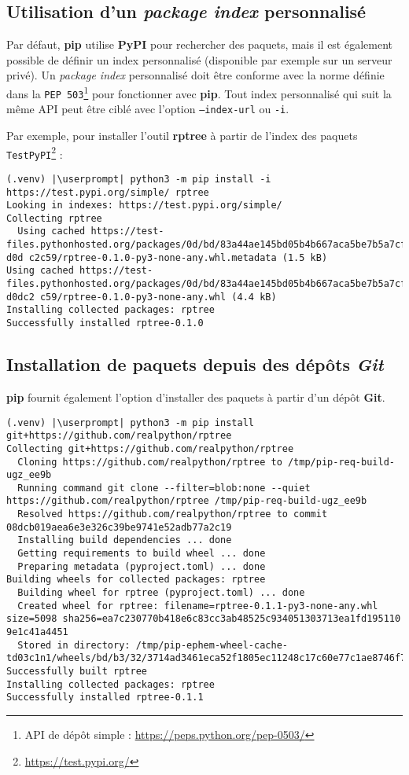 \subsection*{Utilisation d’un \textit{package index} personnalisé}
Par défaut, \textbf{pip} utilise \textbf{PyPI} pour rechercher des paquets, mais il est également possible de définir un index personnalisé (disponible par exemple sur un serveur privé). Un \textit{package index} personnalisé doit être conforme avec la norme définie dans la \texttt{PEP 503}\footnote{API de dépôt simple : \url{https://peps.python.org/pep-0503/}} pour fonctionner avec \textbf{pip}. Tout index personnalisé qui suit la même API peut être ciblé avec l’option \texttt{--index-url} ou \texttt{-i}.

Par exemple, pour installer l’outil \textbf{rptree} à partir de l’index des paquets \texttt{TestPyPI}\footnote{\url{https://test.pypi.org/}} :
\begin{lstlisting}[style=bash]
(.venv) |\userprompt| python3 -m pip install -i https://test.pypi.org/simple/ rptree
Looking in indexes: https://test.pypi.org/simple/
Collecting rptree
  Using cached https://test-files.pythonhosted.org/packages/0d/bd/83a44ae145bd05b4b667aca5be7b5a7cf61d0d26577c0c93f2a2 d0d c2c59/rptree-0.1.0-py3-none-any.whl.metadata (1.5 kB)
Using cached https://test-files.pythonhosted.org/packages/0d/bd/83a44ae145bd05b4b667aca5be7b5a7cf61d0d26577c0c93f2a2 d0dc2 c59/rptree-0.1.0-py3-none-any.whl (4.4 kB)
Installing collected packages: rptree
Successfully installed rptree-0.1.0
\end{lstlisting}

\subsection*{Installation de paquets depuis des dépôts \textit{Git}}
\textbf{pip} fournit également l’option d’installer des paquets à partir d’un dépôt \textbf{Git}. 
\begin{lstlisting}[style=bash]
(.venv) |\userprompt| python3 -m pip install git+https://github.com/realpython/rptree
Collecting git+https://github.com/realpython/rptree
  Cloning https://github.com/realpython/rptree to /tmp/pip-req-build-ugz_ee9b
  Running command git clone --filter=blob:none --quiet https://github.com/realpython/rptree /tmp/pip-req-build-ugz_ee9b
  Resolved https://github.com/realpython/rptree to commit 08dcb019aea6e3e326c39be9741e52adb77a2c19
  Installing build dependencies ... done
  Getting requirements to build wheel ... done
  Preparing metadata (pyproject.toml) ... done
Building wheels for collected packages: rptree
  Building wheel for rptree (pyproject.toml) ... done
  Created wheel for rptree: filename=rptree-0.1.1-py3-none-any.whl size=5098 sha256=ea7c230770b418e6c83cc3ab48525c934051303713ea1fd195110 9e1c41a4451
  Stored in directory: /tmp/pip-ephem-wheel-cache-td03c1n1/wheels/bd/b3/32/3714ad3461eca52f1805ec11248c17c60e77c1ae8746f79179
Successfully built rptree
Installing collected packages: rptree
Successfully installed rptree-0.1.1
\end{lstlisting}

